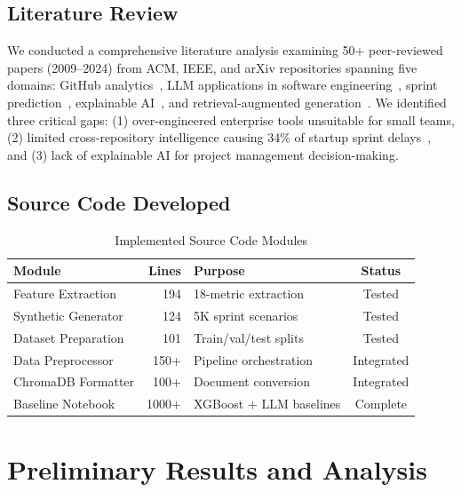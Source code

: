 \documentclass[journal]{IEEEtran}
\begin{document}
\subsection{Literature Review}

We conducted a comprehensive literature analysis examining 50+ peer-reviewed papers (2009--2024) from ACM, IEEE, and arXiv repositories spanning five domains: GitHub analytics~\cite{kalliamvakou2014promises}, LLM applications in software engineering~\cite{touvron2023llama, wang2024survey, feng2020codebert}, sprint prediction~\cite{choetkiertikul2018predicting}, explainable AI~\cite{ribeiro2016should}, and retrieval-augmented generation~\cite{lewis2020retrieval}. We identified three critical gaps: (1) over-engineered enterprise tools unsuitable for small teams, (2) limited cross-repository intelligence causing 34\% of startup sprint delays~\cite{bird2009putting}, and (3) lack of explainable AI for project management decision-making.

\subsection{Source Code Developed}

\begin{table}[htbp]
\centering
\caption{Implemented Source Code Modules}
\label{tab:code}
\begin{tabular}{l|r|l|c}
\toprule
\textbf{Module} & \textbf{Lines} & \textbf{Purpose} & \textbf{Status} \\
\midrule
Feature Extraction & 194 & 18-metric extraction & Tested \\
Synthetic Generator & 124 & 5K sprint scenarios & Tested \\
Dataset Preparation & 101 & Train/val/test splits & Tested \\
Data Preprocessor & 150+ & Pipeline orchestration & Integrated \\
ChromaDB Formatter & 100+ & Document conversion & Integrated \\
Baseline Notebook & 1000+ & XGBoost + LLM baselines & Complete \\
\bottomrule
\end{tabular}
\end{table}

\section{Preliminary Results and Analysis}
\end{document}
